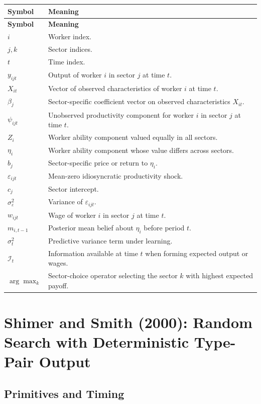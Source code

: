 \documentclass[11pt]{article}
\newcommand{\1}{\mathbf{1}}
\begin{document}
\begin{longtable}{p{}p{}}
\toprule
\textbf{Symbol} & \textbf{Meaning} \\
\midrule
\endfirsthead
\toprule
\textbf{Symbol} & \textbf{Meaning} \\
\midrule
\endhead
\bottomrule
\endfoot
$i$ & Worker index. \\
$j,k$ & Sector indices. \\
$t$ & Time index. \\
$y_{ijt}$ & Output of worker $i$ in sector $j$ at time $t$. \\
$X_{it}$ & Vector of observed characteristics of worker $i$ at time $t$. \\
$\beta_j$ & Sector-specific coefficient vector on observed characteristics $X_{it}$. \\
$\psi_{ijt}$ & Unobserved productivity component for worker $i$ in sector $j$ at time $t$. \\
$Z_i$ & Worker ability component valued equally in all sectors. \\
$\eta_i$ & Worker ability component whose value differs across sectors. \\
$b_j$ & Sector-specific price or return to $\eta_i$. \\
$\varepsilon_{ijt}$ & Mean-zero idiosyncratic productivity shock. \\
$c_j$ & Sector intercept. \\
$\sigma_\varepsilon^2$ & Variance of $\varepsilon_{ijt}$. \\
$w_{ijt}$ & Wage of worker $i$ in sector $j$ at time $t$. \\
$m_{i,t-1}$ & Posterior mean belief about $\eta_i$ before period $t$. \\
$\sigma_t^2$ & Predictive variance term under learning. \\
$\mathcal I_t$ & Information available at time $t$ when forming expected output or wages. \\
$\arg\max_k$ & Sector-choice operator selecting the sector $k$ with highest expected payoff. \\
\end{longtable}

\section{Shimer and Smith (2000): Random Search with Deterministic Type-Pair Output}

\subsection{Primitives and Timing}
\end{document}
